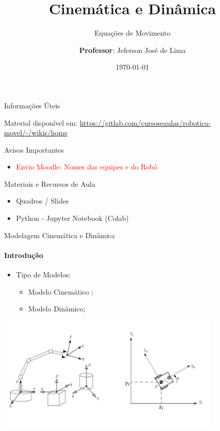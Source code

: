 \documentclass{beamer}
\title{Cinemática e Dinâmica}
\subtitle{Equações de Movimento}
\date{\today}
\author[Jeferson José de Lima]{
  \textbf{Professor}: Jeferson José de Lima}
\institute[UTFPR-PB]{Departamento de Informática (DAINF)}
\newcommand{\cmark}{\textcolor{green}{\ding{51}}}%
\newcommand{\pausar}{\pause}
\begin{document}
\maketitle

\begin{frame}{Informações Úteis}
    \begin{block}{Material disponível em:}
        \href{Robótica Móvel - Wiki}{https://gitlab.com/cursoseaulas/robotica-movel/-/wikis/home}
    \end{block}
    \pausar
    \begin{block}{Avisos Importantes}
        \begin{itemize}
            \item \textcolor{red}{Envio Moodle: Nomes das equipes e do Robô}
        \end{itemize}
    \end{block}
    \pausar
    \begin{block}{Materiais e Recursos de Aula}
        \begin{itemize}
            \item Quadros / Slides
            \item Python - Jupyter Notebook (Colab)
        \end{itemize}
    \end{block}
    
\end{frame}


\begin{frame}{Modelagem Cinemática e Dinâmica}
    \framesubtitle{Introdução}
    \begin{itemize}
        \item Tipo de Modelos:
              \begin{itemize}
                  \item Modelo Cinemático \cmark;
                  \item Modelo Dinâmico;
              \end{itemize}
    \end{itemize}
    \begin{center}
        \includegraphics[width=0.8\textwidth]{./images/mecanismos.jpg}
    \end{center}
\end{frame}
\end{document}
